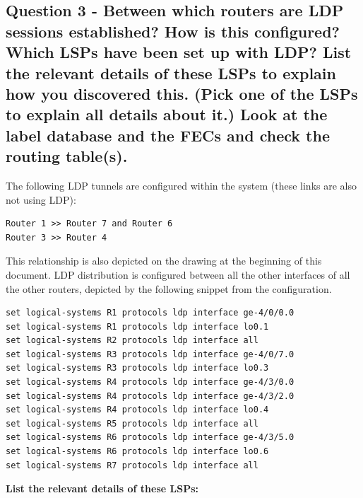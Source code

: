 \documentclass[a4paper]{article}
\begin{document}
\subsection{Question 3 - Between which routers are LDP sessions established? How is this configured? Which LSPs have been set up with LDP? List the relevant details of these LSPs to explain how you discovered this. (Pick one of the LSPs to explain all details about it.) Look at the label database and the FECs and check the routing table(s).}


The following LDP tunnels are configured within the system (these links are also not using LDP):

\begin{verbatim}
Router 1 >> Router 7 and Router 6
Router 3 >> Router 4
\end{verbatim}

This relationship is also depicted on the drawing at the beginning of this document. LDP distribution is configured between all the other interfaces of all the other routers, depicted by the following snippet from the configuration.


\begin{verbatim}
set logical-systems R1 protocols ldp interface ge-4/0/0.0
set logical-systems R1 protocols ldp interface lo0.1
set logical-systems R2 protocols ldp interface all
set logical-systems R3 protocols ldp interface ge-4/0/7.0
set logical-systems R3 protocols ldp interface lo0.3
set logical-systems R4 protocols ldp interface ge-4/3/0.0
set logical-systems R4 protocols ldp interface ge-4/3/2.0
set logical-systems R4 protocols ldp interface lo0.4
set logical-systems R5 protocols ldp interface all
set logical-systems R6 protocols ldp interface ge-4/3/5.0
set logical-systems R6 protocols ldp interface lo0.6
set logical-systems R7 protocols ldp interface all    
\end{verbatim}


\textbf{List the relevant details of these LSPs:}
\end{document}
